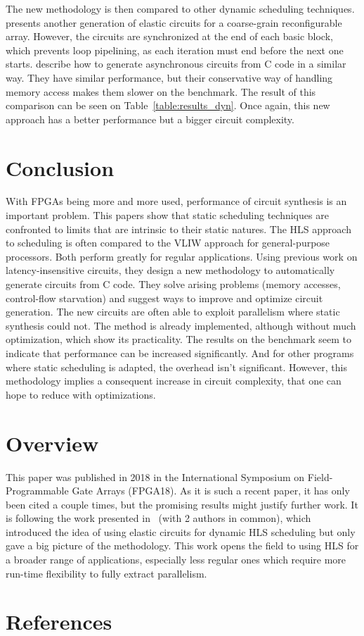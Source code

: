 \documentclass{article}
\begin{document}
The new methodology is then compared to other dynamic scheduling techniques.
\cite{DBLP:conf/fpga/HuangITCW13} presents another generation of elastic circuits for a coarse-grain reconfigurable array. However, the circuits are synchronized at the end of each basic block, which prevents loop pipelining, as each iteration must end before the next one starts.
\cite{DBLP:conf/ispass/BudiuAG05, budiu-tr02} describe how to generate asynchronous circuits from C code in a similar way. They have similar performance, but their conservative way of handling memory access makes them slower on the benchmark.
The result of this comparison can be seen on Table~\ref{table:results_dyn}. Once again, this new approach has a better performance but a bigger circuit complexity.

\section{Conclusion}
With FPGAs being more and more used, performance of circuit synthesis is an important problem.
This papers show that static scheduling techniques are confronted to limits that are intrinsic to their static natures.
The HLS approach to scheduling is often compared to the VLIW approach for general-purpose processors. Both perform greatly for regular applications.
Using previous work on latency-insensitive circuits, they design a new methodology to automatically generate circuits from C code.
They solve arising problems (memory accesses, control-flow starvation) and suggest ways to improve and optimize circuit generation.
The new circuits are often able to exploit parallelism where static synthesis could not.
The method is already implemented, although without much optimization, which show its practicality.
The results on the benchmark seem to indicate that performance can be increased significantly. And for other programs where static scheduling is adapted, the overhead isn't significant.
However, this methodology implies a consequent increase in circuit complexity, that one can hope to reduce with optimizations. 

\section{Overview}
This paper was published in 2018 in the International Symposium on Field-Programmable Gate Arrays (FPGA18).
As it is such a recent paper, it has only been cited a couple times, but the promising results might justify further work.
It is following the work presented in~\cite{DBLP:conf/acssc/JosipovicBI17} (with 2 authors in common), which introduced the idea of using elastic circuits for dynamic HLS scheduling but only gave a big picture of the methodology.
This work opens the field to using HLS for a broader range of applications, especially less regular ones which require more run-time flexibility to fully extract parallelism.

\section{References}


\end{document}
